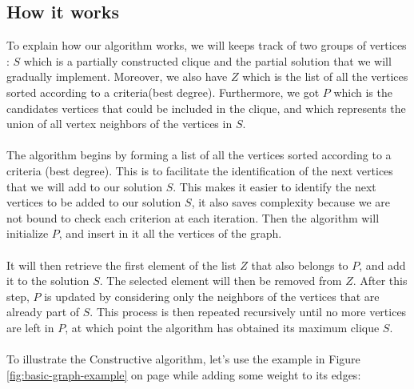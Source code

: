 
\subsection{How it works}

    To explain how our algorithm works, we will keeps track of two groups of vertices : $S$ which is a partially constructed clique and the partial solution that we will gradually implement. Moreover, we also have $Z$ which is the list of all the vertices sorted according to a criteria(best degree). Furthermore, we got $P$  which is the candidates vertices that could be included in the clique, and which represents the union of all vertex neighbors of the vertices in $S$.
    \\ \\
    The algorithm begins by forming a list of all the vertices sorted according to a criteria (best degree). This is to facilitate the identification of the next vertices that we will add to our solution $S$. This makes it easier to identify the next vertices to be added to our solution $S$, it also saves complexity because we are not bound to check each criterion at each iteration. Then the algorithm will initialize $P$, and insert in it all the vertices of the graph.
    \\ \\
    It will then retrieve the first element of the list $Z$ that also belongs to $P$, and add it to the solution $S$. The selected element will then be removed from $Z$. After this step, $P$ is updated by considering only the neighbors of the vertices that are already part of $S$. This process is then repeated recursively until no more vertices are left in $P$, at which point the algorithm has obtained its maximum clique $S$.
    \\ \\
    To illustrate the Constructive algorithm, let's use the example in
    Figure \ref{fig:basic-graph-example} on page \pageref{fig:basic-graph-example} while adding some weight to its edges: \\

